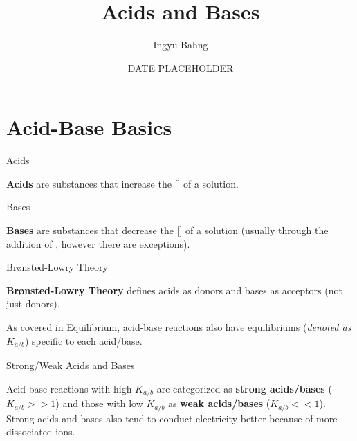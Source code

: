 \documentclass[10pt]{article}
\title{Acids and Bases}
\date{DATE PLACEHOLDER}
\author{Ingyu Bahng}
\begin{document}


\section{Acid-Base Basics}

\begin{definition}{Acids}

    \textbf{Acids} are substances that increase the [] of a solution.

    

  \end{definition}

  \begin{definition}{Bases}

    \textbf{Bases} are substances that decrease the [] of a solution (usually through the addition of , however there are exceptions).

    
    
  \end{definition}
 
  \begin{core}{Brønsted-Lowry Theory}

     \textbf{Brønsted-Lowry Theory} defines acids as  donors and bases as  acceptors (not just  donors).
     
  \end{core}

  As covered in \href{../equilibrium/equilibrium.pdf}{Equilibrium}, acid-base reactions also have equilibriums (\textit{denoted as $K_{a/b}$}) specific to each acid/base.

  \begin{definition}{Strong/Weak Acids and Bases}
   
    Acid-base reactions with high $K_{a/b}$ are categorized as \textbf{strong acids/bases} ($K_{a/b} >> 1$) and those with low $K_{a/b}$ as \textbf{weak acids/bases} ($K_{a/b} << 1$). Strong acids and bases also tend to conduct electricity better because of more dissociated ions.

  \end{definition}
  
\end{document}

